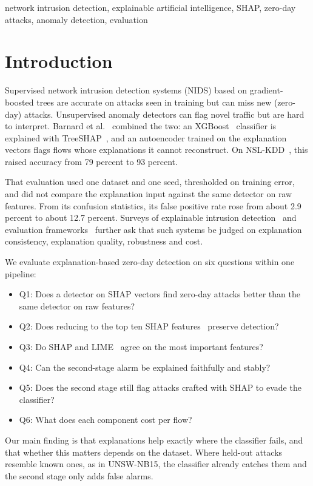 \documentclass[conference]{IEEEtran}
\begin{document}
\begin{IEEEkeywords}
network intrusion detection, explainable artificial intelligence, SHAP, zero-day attacks, anomaly detection, evaluation
\end{IEEEkeywords}

\section{Introduction}
Supervised network intrusion detection systems (NIDS) based on gradient-boosted trees are accurate on attacks seen in training but can miss new (zero-day) attacks. Unsupervised anomaly detectors can flag novel traffic but are hard to interpret. Barnard et al.~\cite{barnard2022robust} combined the two: an XGBoost~\cite{chen2016xgboost} classifier is explained with TreeSHAP~\cite{lundberg2020trees}, and an autoencoder trained on the explanation vectors flags flows whose explanations it cannot reconstruct. On NSL-KDD~\cite{tavallaee2009nslkdd}, this raised accuracy from 79 percent to 93 percent.

That evaluation used one dataset and one seed, thresholded on training error, and did not compare the explanation input against the same detector on raw features. From its confusion statistics, its false positive rate rose from about 2.9 percent to about 12.7 percent. Surveys of explainable intrusion detection~\cite{neupane2022xids,khan2024xids,rjoub2023survey} and evaluation frameworks~\cite{arreche2024exai,warnecke2020evaluating} further ask that such systems be judged on explanation consistency, explanation quality, robustness and cost.

We evaluate explanation-based zero-day detection on six questions within one pipeline:
\begin{itemize}
\item Q1: Does a detector on SHAP vectors find zero-day attacks better than the same detector on raw features?
\item Q2: Does reducing to the top ten SHAP features~\cite{nugraha2025versatile} preserve detection?
\item Q3: Do SHAP and LIME~\cite{ribeiro2016lime} agree on the most important features?
\item Q4: Can the second-stage alarm be explained faithfully and stably?
\item Q5: Does the second stage still flag attacks crafted with SHAP to evade the classifier?
\item Q6: What does each component cost per flow?
\end{itemize}
Our main finding is that explanations help exactly where the classifier fails, and that whether this matters depends on the dataset. Where held-out attacks resemble known ones, as in UNSW-NB15, the classifier already catches them and the second stage only adds false alarms.
\end{document}
